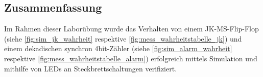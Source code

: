 \documentclass[12pt,english,ngerman]{scrartcl}
\begin{document}
\subsection{Zusammenfassung}
Im Rahmen dieser Laborübung wurde das Verhalten von einem JK-MS-Flip-Flop (siehe \autoref{fig:sim_jk_wahrheit}
respektive \autoref{fig:mess_wahrheitstabelle_jk}) und einem dekadischen synchron 4bit-Zähler
(siehe \autoref{fig:sim_alarm_wahrheit}
respektive \autoref{fig:mess_wahrheitstabelle_alarm}) erfolgreich mittels 
Simulation und mithilfe von LEDs an Steckbrettschaltungen
verifiziert.
\newpage

\printbibliography

\listoffigures

\listoftables
\end{document}

